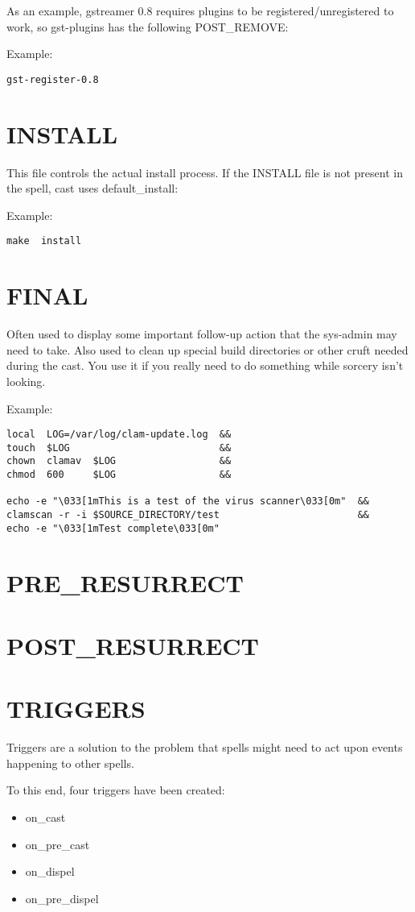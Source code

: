 \documentclass[a4paper,10pt]{book}
\begin{document}
As an example, gstreamer 0.8 requires plugins to be registered/unregistered to
work, so gst-plugins has the following POST\_REMOVE:

Example:
\begin{verbatim}
gst-register-0.8
\end{verbatim}

\section{INSTALL}
This file controls the actual install process.  If the INSTALL file is not
present in the spell, cast uses default\_install:

Example:
\begin{verbatim}
make  install
\end{verbatim}


\section{FINAL}
Often used to display some important follow-up action that the sys-admin may
need to take. Also used to clean up special build directories or other cruft
needed during the cast. You use it if you really need to do something while
sorcery isn't looking.

Example:
\begin{verbatim}
local  LOG=/var/log/clam-update.log  &&
touch  $LOG                          &&
chown  clamav  $LOG                  &&
chmod  600     $LOG                  &&

echo -e "\033[1mThis is a test of the virus scanner\033[0m"  &&
clamscan -r -i $SOURCE_DIRECTORY/test                        &&
echo -e "\033[1mTest complete\033[0m"
\end{verbatim}

\section{PRE\_RESURRECT}
\section{POST\_RESURRECT}
\section{TRIGGERS}
Triggers are a solution to the problem that spells might need to act upon
events happening to other spells.

To this end, four triggers have been created:
\begin{itemize}
\item on\_cast
\item on\_pre\_cast
\item on\_dispel
\item on\_pre\_dispel
\end{itemize}
\end{document}
